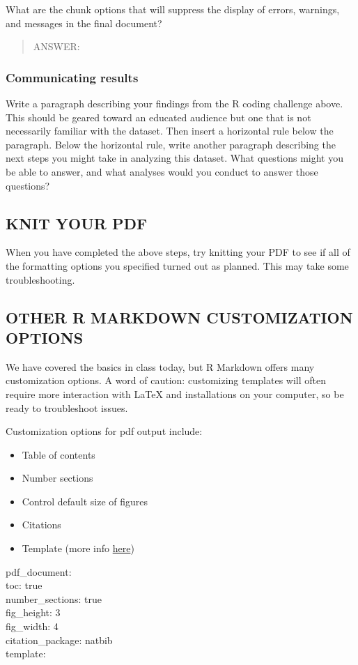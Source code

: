 \documentclass[]{article}
\providecommand{\tightlist}{%
  \setlength{\itemsep}{0pt}\setlength{\parskip}{0pt}}
\begin{document}
What are the chunk options that will suppress the display of errors,
warnings, and messages in the final document?

\begin{quote}
ANSWER:
\end{quote}

\subsubsection{Communicating results}\label{communicating-results}

Write a paragraph describing your findings from the R coding challenge
above. This should be geared toward an educated audience but one that is
not necessarily familiar with the dataset. Then insert a horizontal rule
below the paragraph. Below the horizontal rule, write another paragraph
describing the next steps you might take in analyzing this dataset. What
questions might you be able to answer, and what analyses would you
conduct to answer those questions?

\subsection{KNIT YOUR PDF}\label{knit-your-pdf}

When you have completed the above steps, try knitting your PDF to see if
all of the formatting options you specified turned out as planned. This
may take some troubleshooting.

\subsection{OTHER R MARKDOWN CUSTOMIZATION
OPTIONS}\label{other-r-markdown-customization-options}

We have covered the basics in class today, but R Markdown offers many
customization options. A word of caution: customizing templates will
often require more interaction with LaTeX and installations on your
computer, so be ready to troubleshoot issues.

Customization options for pdf output include:

\begin{itemize}
\tightlist
\item
  Table of contents
\item
  Number sections
\item
  Control default size of figures
\item
  Citations
\item
  Template (more info
  \href{http://jianghao.wang/post/2017-12-08-rmarkdown-templates/}{here})
\end{itemize}

pdf\_document:\\
toc: true\\
number\_sections: true\\
fig\_height: 3\\
fig\_width: 4\\
citation\_package: natbib\\
template:
\end{document}
